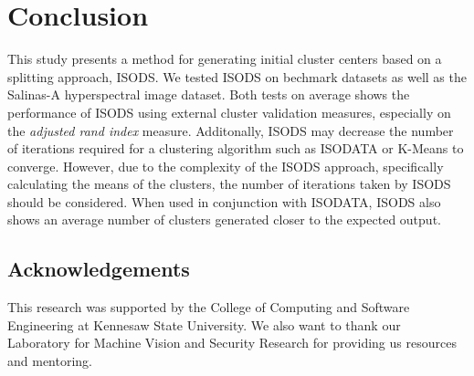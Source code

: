 \documentclass[a4paper,10pt]{article}
\begin{document}

\section{Conclusion}
This study presents a method for generating initial cluster centers based on a
splitting approach, ISODS. We tested ISODS on bechmark datasets as well as the
Salinas-A hyperspectral image dataset. Both tests on average shows the
performance of ISODS using external cluster validation measures, especially on
the \textit{adjusted rand index} measure. Additonally, ISODS may decrease the
number of iterations required for a clustering algorithm such as ISODATA or
K-Means to converge. However, due to the complexity of the ISODS approach,
specifically calculating the means of the clusters, the number of iterations
taken by ISODS should be considered. When used in conjunction with ISODATA,
ISODS also shows an average number of clusters generated closer to the expected
output.


\subsection*{Acknowledgements}
This research was supported by the College of Computing and Software Engineering
at Kennesaw State University. We also want to thank our Laboratory for Machine
Vision and Security Research for providing us resources and mentoring.

\vspace{5mm}



\end{document}
